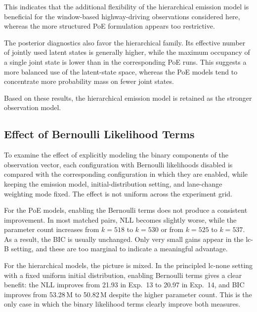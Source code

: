 \par This indicates that the additional flexibility of the hierarchical emission model is beneficial for the window-based highway-driving observations considered here, 
whereas the more structured \ac{PoE} formulation appears too restrictive.

\par The posterior diagnostics also favor the hierarchical family.  
Its effective number of jointly used latent states is generally higher, while the maximum occupancy of a single joint state is lower than in the corresponding \ac{PoE} runs. 
This suggests a more balanced use of the latent-state space, whereas the \ac{PoE} models tend to concentrate more probability mass on fewer joint states.

\par Based on these results, the hierarchical emission model is retained as the stronger observation model.

\subsection{Effect of Bernoulli Likelihood Terms}
To examine the effect of explicitly modeling the binary components of the observation vector, each configuration with Bernoulli likelihoods disabled is compared with the 
corresponding configuration in which they are enabled, while keeping the emission model, initial-distribution setting, and lane-change weighting mode fixed. 
The effect is not uniform across the experiment grid.

\par For the \ac{PoE} models, enabling the Bernoulli terms does not produce a consistent improvement. 
In most matched pairs, \ac{NLL} becomes slightly worse, while the parameter count increases from $k=518$ to $k=530$ or from $k=525$ to $k=537$. 
As a result, the \ac{BIC} is usually unchanged. 
Only very small gains appear in the lc-B setting, and these are too marginal to indicate a meaningful advantage.

\par For the hierarchical models, the picture is mixed. 
In the principled lc-none setting with a fixed uniform initial distribution, enabling Bernoulli terms gives a clear benefit: the \ac{NLL} improves from 21.93 in Exp.~13 to 20.97 
in Exp.~14, and \ac{BIC} improves from 53.28\,M to 50.82\,M despite the higher parameter count. 
This is the only case in which the binary likelihood terms clearly improve both measures.

